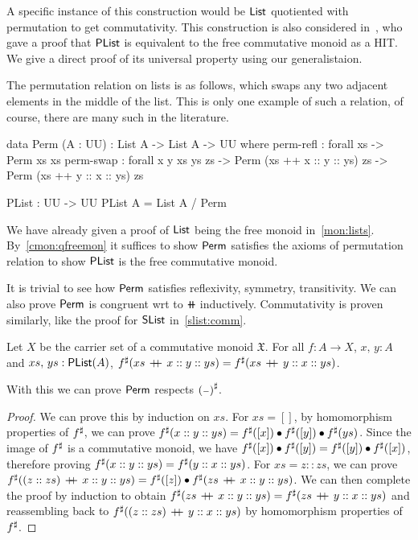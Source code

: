 A specific instance of this construction would be $\operatorname{\mathsf{List}}$ quotiented with permutation to get commutativity. This
construction is also considered in~\cite{joramConstructiveFinalSemantics2023}, who gave a proof that $\operatorname{\mathsf{PList}}$ is
equivalent to the free commutative monoid as a HIT. We give a direct proof of its universal property using our
generalistaion.

The permutation relation on lists is as follows, which swaps any two adjacent elements in the middle of the list.
This is only one example of such a relation, of course, there are many such in the literature.
\begin{definition}[PList]
    \leavevmode
    \begin{code}
data Perm (A : UU) : List A -> List A -> UU where
  perm-refl : forall {xs} -> Perm xs xs
  perm-swap : forall {x y xs ys zs}
           -> Perm (xs ++ x :: y :: ys) zs
           -> Perm (xs ++ y :: x :: ys) zs

PList : UU -> UU
PList A = List A / Perm
    \end{code}
\end{definition}

We have already given a proof of $\operatorname{\mathsf{List}}$ being the free monoid in~\cref{mon:lists}.
By~\cref{cmon:qfreemon} it suffices to show $\operatorname{\mathsf{Perm}}$ satisfies the axioms of permutation relation
to show $\operatorname{\mathsf{PList}}$ is the free commutative monoid.

It is trivial to see how $\operatorname{\mathsf{Perm}}$ satisfies reflexivity, symmetry, transitivity.
We can also prove $\operatorname{\mathsf{Perm}}$ is congruent wrt to $\doubleplus$ inductively.
Commutativity is proven similarly, like the proof for $\operatorname{\mathsf{SList}}$ in~\cref{slist:comm}.

\begin{proposition}\label{plist:sharp-sat}
    Let $X$ be the carrier set of a commutative monoid $\mathfrak{X}$.
    For all $f : A \to X$, $x, \, y : A$ and $xs, \, ys : \operatorname{\mathsf{PList}}(A)$,
    ${f}^{\sharp}(xs\,\mathbin{+\kern -0.4em+}\,x :: y :: ys) = {f}^{\sharp}(xs\,\mathbin{+\kern -0.4em+}\,y :: x :: ys)$.
\end{proposition}

With this we can prove $\operatorname{\mathsf{Perm}}$ respects ${({\scriptstyle{-}})}^{\sharp}$.

\begin{proof}
    We can prove this by induction on $xs$. For $xs = []$, by homomorphism properties of ${f}^{\sharp}$,
    we can prove ${f}^{\sharp}(x :: y :: ys) = {f}^{\sharp}([ x ]) \mathbin{\bullet} {f}^{\sharp}([ y ]) \mathbin{\bullet} {f}^{\sharp}(ys)$.
    Since the image of ${f}^{\sharp}$ is a commutative monoid, we have
    ${f}^{\sharp}([ x ]) \mathbin{\bullet} {f}^{\sharp}([ y ]) = {f}^{\sharp}([ y ]) \mathbin{\bullet} {f}^{\sharp}([ x ])$, therefore proving
    ${f}^{\sharp}(x :: y :: ys) = {f}^{\sharp}(y :: x :: ys)$. For $xs = z :: zs$, we can prove
    ${f}^{\sharp}((z :: zs)\,\mathbin{+\kern -0.4em+}\,x :: y :: ys) = {f}^{\sharp}([ z ]) \mathbin{\bullet} {f}^{\sharp}(zs\,\mathbin{+\kern -0.4em+}\,x :: y :: ys)$.
    We can then complete the proof by induction to obtain
    ${f}^{\sharp}(zs\,\mathbin{+\kern -0.4em+}\,x :: y :: ys) = {f}^{\sharp}(zs\,\mathbin{+\kern -0.4em+}\,y :: x :: ys)$ and reassembling
    back to ${f}^{\sharp}((z :: zs)\,\mathbin{+\kern -0.4em+}\,y :: x :: ys)$ by homomorphism properties of ${f}^{\sharp}$.
\end{proof}

